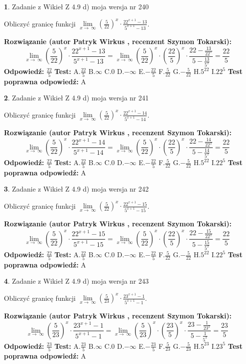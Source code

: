 \documentclass[12pt, a4paper]{article}
\theoremstyle{definition} %
\newtheorem{zad}{}
\newcommand{\zadStart}[1]{\begin{zad}#1\newline}
\newcommand{\zadStop}{\end{zad}}
\newcommand{\rozwStart}[2]{\noindent \textbf{Rozwiązanie (autor #1 , recenzent #2): }\newline}
\newcommand{\rozwStop}{\newline}
\newcommand{\odpStart}{\noindent \textbf{Odpowiedź:}\newline}
\newcommand{\odpStop}{\newline}
\newcommand{\testStart}{\noindent \textbf{Test:}\newline}
\newcommand{\testStop}{\newline}
\newcommand{\kluczStart}{\noindent \textbf{Test poprawna odpowiedź:}\newline}
\newcommand{\kluczStop}{\newline}
\begin{document}
\zadStart{Zadanie z Wikieł Z 4.9 d) moja wersja nr 240}


Obliczyć granicę funkcji  $\lim\limits_{x\to\ \infty}(\frac{5}{22})^{x}\cdot\frac{22^{x+1}-13}{5^{x+1}-13}$.
\zadStop
\rozwStart{Patryk Wirkus}{Szymon Tokarski}
$$\lim\limits_{x\to\ \infty}(\frac{5}{22})^{x}\cdot\frac{22^{x+1}-13}{5^{x+1}-13}=\lim\limits_{x\to\ \infty}(\frac{5}{22})^{x}\cdot(\frac{22}{5})^{x} \cdot \frac{22-\frac{13}{22^{x}}}{5-\frac{13}{5^{x}}} = \frac{22}{5}$$
\rozwStop
\odpStart
$\frac{22}{5}$
\odpStop
\testStart
A.$\frac{22}{5}$ B.$\infty$ C.$0$ D.$-\infty$ E.$-\frac{22}{5}$
F.$\frac{5}{22}$ G.$-\frac{5}{22}$
H.$5^{22}$
I.$22^{5}$
\testStop
\kluczStart
A
\kluczStop



\zadStart{Zadanie z Wikieł Z 4.9 d) moja wersja nr 241}


Obliczyć granicę funkcji  $\lim\limits_{x\to\ \infty}(\frac{5}{22})^{x}\cdot\frac{22^{x+1}-14}{5^{x+1}-14}$.
\zadStop
\rozwStart{Patryk Wirkus}{Szymon Tokarski}
$$\lim\limits_{x\to\ \infty}(\frac{5}{22})^{x}\cdot\frac{22^{x+1}-14}{5^{x+1}-14}=\lim\limits_{x\to\ \infty}(\frac{5}{22})^{x}\cdot(\frac{22}{5})^{x} \cdot \frac{22-\frac{14}{22^{x}}}{5-\frac{14}{5^{x}}} = \frac{22}{5}$$
\rozwStop
\odpStart
$\frac{22}{5}$
\odpStop
\testStart
A.$\frac{22}{5}$ B.$\infty$ C.$0$ D.$-\infty$ E.$-\frac{22}{5}$
F.$\frac{5}{22}$ G.$-\frac{5}{22}$
H.$5^{22}$
I.$22^{5}$
\testStop
\kluczStart
A
\kluczStop



\zadStart{Zadanie z Wikieł Z 4.9 d) moja wersja nr 242}


Obliczyć granicę funkcji  $\lim\limits_{x\to\ \infty}(\frac{5}{22})^{x}\cdot\frac{22^{x+1}-15}{5^{x+1}-15}$.
\zadStop
\rozwStart{Patryk Wirkus}{Szymon Tokarski}
$$\lim\limits_{x\to\ \infty}(\frac{5}{22})^{x}\cdot\frac{22^{x+1}-15}{5^{x+1}-15}=\lim\limits_{x\to\ \infty}(\frac{5}{22})^{x}\cdot(\frac{22}{5})^{x} \cdot \frac{22-\frac{15}{22^{x}}}{5-\frac{15}{5^{x}}} = \frac{22}{5}$$
\rozwStop
\odpStart
$\frac{22}{5}$
\odpStop
\testStart
A.$\frac{22}{5}$ B.$\infty$ C.$0$ D.$-\infty$ E.$-\frac{22}{5}$
F.$\frac{5}{22}$ G.$-\frac{5}{22}$
H.$5^{22}$
I.$22^{5}$
\testStop
\kluczStart
A
\kluczStop



\zadStart{Zadanie z Wikieł Z 4.9 d) moja wersja nr 243}


Obliczyć granicę funkcji  $\lim\limits_{x\to\ \infty}(\frac{5}{23})^{x}\cdot\frac{23^{x+1}-1}{5^{x+1}-1}$.
\zadStop
\rozwStart{Patryk Wirkus}{Szymon Tokarski}
$$\lim\limits_{x\to\ \infty}(\frac{5}{23})^{x}\cdot\frac{23^{x+1}-1}{5^{x+1}-1}=\lim\limits_{x\to\ \infty}(\frac{5}{23})^{x}\cdot(\frac{23}{5})^{x} \cdot \frac{23-\frac{1}{23^{x}}}{5-\frac{1}{5^{x}}} = \frac{23}{5}$$
\rozwStop
\odpStart
$\frac{23}{5}$
\odpStop
\testStart
A.$\frac{23}{5}$ B.$\infty$ C.$0$ D.$-\infty$ E.$-\frac{23}{5}$
F.$\frac{5}{23}$ G.$-\frac{5}{23}$
H.$5^{23}$
I.$23^{5}$
\testStop
\kluczStart
A
\kluczStop
\end{document}

